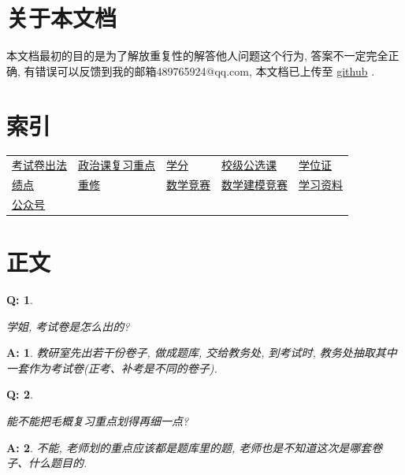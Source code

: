 \documentclass[UTF8]{ctexart}
\theoremstyle{nonumberplain}
\newtheorem{Q}{Q:}
\theoremstyle{nonumberplain}
\newtheorem{A}{A:}
\newcommand{\FAQ}[2]{
    \begin{Q}
        #1
    \end{Q}
    \begin{A}
        #2
    \end{A}
}
\begin{document}
    \section{关于本文档}
    本文档最初的目的是为了解放重复性的解答他人问题这个行为, 答案不一定完全正确, 有错误可以反馈到我的邮箱489765924@qq.com, 本文档已上传至 \href{https://github.com/sikouhjw/jxustFAQ}{github} .

    \section{索引}

    \begin{center}
    \begin{tabularx}{\textwidth}{ZZZZZ}
        \hyperlink{1}{考试卷出法} & \hyperlink{2}{政治课复习重点} & \hyperlink{3}{学分} & \hyperlink{4}{校级公选课} & \hyperlink{5}{学位证}\\
        \hyperlink{6}{绩点} & \hyperlink{7}{重修} & \hyperlink{8}{数学竞赛} & \hyperlink{9}{数学建模竞赛} & \hyperlink{10}{学习资料} \\
        \hyperlink{11}{公众号} & & & & \\
    \end{tabularx}
    \end{center}
    
    
    \section{正文}
    
    \FAQ{\hypertarget{1}{学姐, 考试卷是怎么出的?}}{
        教研室先出若干份卷子, 做成题库, 交给教务处, 到考试时, 教务处抽取其中一套作为考试卷(正考、补考是不同的卷子).
    }

    \FAQ{\hypertarget{2}{能不能把毛概复习重点划得再细一点?}}{
        不能, 老师划的重点应该都是题库里的题, 老师也是不知道这次是哪套卷子、什么题目的.
    }
\end{document}
